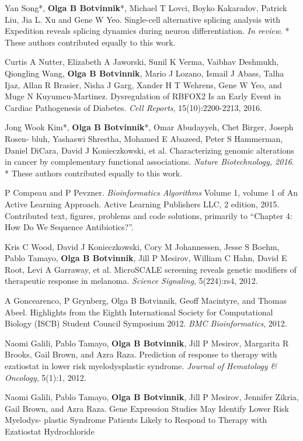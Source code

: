 \begin{frontmatter}
\begin{vitapage}
\begin{publications}
\item Yan Song*, \textbf{Olga B Botvinnik}*, Michael T Lovci, Boyko Kakaradov, Patrick Liu, Jia L. Xu and Gene W Yeo. Single-cell alternative splicing analysis with Expedition reveals splicing dynamics during neuron differentiation. \emph{In review}. * These authors contributed equally to this work.
\item Curtis A Nutter, Elizabeth A Jaworski, Sunil K Verma, Vaibhav Deshmukh, Qiongling Wang, \textbf{Olga B Botvinnik}, Mario J Lozano, Ismail J Abass, Talha Ijaz, Allan R Brasier, Nisha J Garg, Xander H T Wehrens, Gene W Yeo, and Muge N Kuyumcu-Martinez. Dysregulation of RBFOX2 Is an Early Event in Cardiac Pathogenesis of Diabetes. \emph{Cell Reports}, 15(10):2200-2213, 2016.
\item Jong Wook Kim*, \textbf{Olga B Botvinnik}*, Omar Abudayyeh, Chet Birger, Joseph Rosen- bluh, Yashaswi Shrestha, Mohamed E Abazeed, Peter S Hammerman, Daniel DiCara, David J Konieczkowski, et al. Characterizing genomic alterations in cancer by complementary functional associations. \emph{Nature Biotechnology, 2016}. * These authors contributed equally to this work.
\item P Compeau and P Pevzner. \emph{Bioinformatics Algorithms} Volume 1, volume 1 of An Active Learning Approach. Active Learning Publishers LLC, 2 edition, 2015. Contributed text, figures, problems and code solutions, primarily to ``Chapter 4: How Do We Sequence Antibiotics?''.
\item Kris C Wood, David J Konieczkowski, Cory M Johannessen, Jesse S Boehm, Pablo Tamayo, \textbf{Olga B Botvinnik}, Jill P Mesirov, William C Hahn, David E Root, Levi A Garraway, et al. MicroSCALE screening reveals genetic modifiers of therapeutic response in melanoma. \emph{Science Signaling}, 5(224):rs4, 2012.
\item A Goncearenco, P Grynberg, Olga B Botvinnik, Geoff Macintyre, and Thomas Abeel. Highlights from the Eighth International Society for Computational Biology (ISCB) Student Council Symposium 2012. \emph{BMC Bioinformatics}, 2012.
\item Naomi Galili, Pablo Tamayo, \textbf{Olga B Botvinnik}, Jill P Mesirov, Margarita R Brooks, Gail Brown, and Azra Raza. Prediction of response to therapy with ezatiostat in lower risk myelodysplastic syndrome. \emph{Journal of Hematology \& Oncology}, 5(1):1, 2012.
\item Naomi Galili, Pablo Tamayo, \textbf{Olga B Botvinnik}, Jill P Mesirov, Jennifer Zikria, Gail Brown, and Azra Raza. Gene Expression Studies May Identify Lower Risk Myelodys- plastic Syndrome Patients Likely to Respond to Therapy with Ezatiostat Hydrochloride

\end{publications}
\end{vitapage}
\end{frontmatter}

